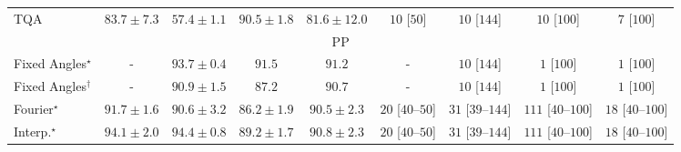 \begin{tabular}{l|cccc|cccc|}
TQA & {\cellcolor[HTML]{DD5F0C}} \color[HTML]{F1F1F1} $83.7\pm 7.3$ & {\cellcolor[HTML]{FFF8C2}} \color[HTML]{000000} $57.4\pm 1.1$ & {\cellcolor[HTML]{AB3C03}} \color[HTML]{F1F1F1} $90.5\pm 1.8$ & {\cellcolor[HTML]{E96D13}} \color[HTML]{F1F1F1} $81.6\pm 12.0$ & {\cellcolor[HTML]{FFF6F2}} \color[HTML]{000000} $10$ [$50$] & {\cellcolor[HTML]{FFF6F2}} \color[HTML]{000000} $10$ [$144$] & {\cellcolor[HTML]{FFF6F2}} \color[HTML]{000000} $10$ [$100$] & {\cellcolor[HTML]{FFF6F2}} \color[HTML]{000000} $7$ [$100$] \\
\cline{1-9}
\multicolumn{9}{c}{\rule{0pt}{8pt}PP} \\
\midrule
Fixed Angles$^\star$ & {\cellcolor[HTML]{000000}} \color[HTML]{F1F1F1} {\cellcolor{white}} \color{black} - & {\cellcolor[HTML]{006234}} \color[HTML]{F1F1F1} $93.7\pm 0.4$ & {\cellcolor[HTML]{076D39}} \color[HTML]{F1F1F1} $91.5$ & {\cellcolor[HTML]{096F3A}} \color[HTML]{F1F1F1} $91.2$ & {\cellcolor[HTML]{000000}} \color[HTML]{F1F1F1} {\cellcolor{white}} \color{black} - & {\cellcolor[HTML]{FFF6F2}} \color[HTML]{000000} $10$ [$144$] & {\cellcolor[HTML]{FFF7F3}} \color[HTML]{000000} $1$ [$100$] & {\cellcolor[HTML]{FFF7F3}} \color[HTML]{000000} $1$ [$100$] \\
Fixed Angles$^\dagger$ & {\cellcolor[HTML]{000000}} \color[HTML]{F1F1F1} {\cellcolor{white}} \color{black} - & {\cellcolor[HTML]{0A703A}} \color[HTML]{F1F1F1} $90.9\pm 1.5$ & {\cellcolor[HTML]{218242}} \color[HTML]{F1F1F1} $87.2$ & {\cellcolor[HTML]{0B713B}} \color[HTML]{F1F1F1} $90.7$ & {\cellcolor[HTML]{000000}} \color[HTML]{F1F1F1} {\cellcolor{white}} \color{black} - & {\cellcolor[HTML]{FFF6F2}} \color[HTML]{000000} $10$ [$144$] & {\cellcolor[HTML]{FFF7F3}} \color[HTML]{000000} $1$ [$100$] & {\cellcolor[HTML]{FFF7F3}} \color[HTML]{000000} $1$ [$100$] \\
Fourier$^\star$ & {\cellcolor[HTML]{066D39}} \color[HTML]{F1F1F1} $91.7\pm 1.6$ & {\cellcolor[HTML]{0C723B}} \color[HTML]{F1F1F1} $90.6\pm 3.2$ & {\cellcolor[HTML]{268846}} \color[HTML]{F1F1F1} $86.2\pm 1.9$ & {\cellcolor[HTML]{0C723B}} \color[HTML]{F1F1F1} $90.5\pm 2.3$ & {\cellcolor[HTML]{FFF3EF}} \color[HTML]{000000} $20$ [$40$--$50$] & {\cellcolor[HTML]{FEF1ED}} \color[HTML]{000000} $31$ [$39$--$144$] & {\cellcolor[HTML]{FDDDD9}} \color[HTML]{000000} $111$ [$40$--$100$] & {\cellcolor[HTML]{FFF3F0}} \color[HTML]{000000} $18$ [$40$--$100$] \\
Interp.$^\star$ & {\cellcolor[HTML]{005E33}} \color[HTML]{F1F1F1} $94.1\pm 2.0$ & {\cellcolor[HTML]{005D33}} \color[HTML]{F1F1F1} $94.4\pm 0.8$ & {\cellcolor[HTML]{15793E}} \color[HTML]{F1F1F1} $89.2\pm 1.7$ & {\cellcolor[HTML]{0B713B}} \color[HTML]{F1F1F1} $90.8\pm 2.3$ & {\cellcolor[HTML]{FFF3EF}} \color[HTML]{000000} $20$ [$40$--$50$] & {\cellcolor[HTML]{FEF1ED}} \color[HTML]{000000} $31$ [$39$--$144$] & {\cellcolor[HTML]{FDDDD9}} \color[HTML]{000000} $111$ [$40$--$100$] & {\cellcolor[HTML]{FFF3F0}} \color[HTML]{000000} $18$ [$40$--$100$] \\

\end{tabular}
